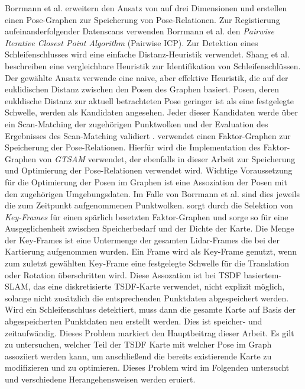Borrmann et al. \cite{borrmann2008globally} erweitern den Ansatz von \cite{lu1997globally} auf drei Dimensionen und erstellen einen Pose-Graphen zur Speicherung von Pose-Relationen. Zur Registierung aufeinanderfolgender Datenscans verwenden Borrmann et al. \cite{borrmann2008globally} den \textit{Pairwise Iterative Closest Point Algorithm} (Pairwise ICP). Zur Detektion eines Schleifenschlusses wird eine einfache Distanz-Heuristik verwendet. Shang et al. \cite{shan2020lio} beschreiben eine vergleichbare Heuristik zur Identifikation von Schleifenschlüssen. Der gewählte Ansatz verwende eine naive, aber effektive Heuristik, die auf der euklidischen Distanz zwischen den Posen des Graphen basiert. Posen, deren eukldische Distanz zur aktuell betrachteten Pose geringer ist als eine festgelegte Schwelle, werden als Kandidaten angesehen. Jeder dieser Kandidaten werde über ein Scan-Matching der zugehörigen Punktwolken und der Evaluation des Ergebnisses des Scan-Matching validiert \cite{shan2020lio}. \cite{shan2020lio} verwendet einen Faktor-Graphen zur Speicherung der Pose-Relationen. Hierfür wird die Implementation des Faktor-Graphen von \emph{GTSAM} \cite{dellaert2012factor} verwendet, der ebenfalls in dieser Arbeit zur Speicherung und Optimierung der Pose-Relationen verwendet wird.
Wichtige Voraussetzung für die Optimierung der Posen im Graphen ist eine Assoziation der Posen mit den zugehörigen Umgebungsdaten. Im Falle von Borrmann et al. \cite{borrmann2008globally} sind dies jeweils die zum Zeitpunkt aufgenommenen Punktwolken. \cite{shan2020lio} sorgt durch die Selektion von \emph{Key-Frames} für einen spärlich besetzten Faktor-Graphen und sorge so für eine Ausgeglichenheit zwischen Speicherbedarf und der Dichte der Karte. Die Menge der Key-Frames ist eine Untermenge der gesamten Lidar-Frames die bei der Kartierung aufgenommen wurden. Ein Frame wird als Key-Frame genutzt, wenn zum zuletzt gewählten Key-Frame eine festgelegte Schwelle für die Translation oder Rotation überschritten wird. Diese Assozation ist bei TSDF basiertem-SLAM, das eine diskretisierte TSDF-Karte verwendet, nicht explizit möglich, solange nicht zusätzlich die entsprechenden Punktdaten abgespeichert werden.
Wird ein Schleifenschluss detektiert, muss dann die gesamte Karte auf Basis der abgespeicherten Punktdaten neu erstellt werden. Dies ist speicher- und zeitaufwändig.
Dieses Problem markiert den Hauptbeitrag dieser Arbeit. Es gilt zu untersuchen, welcher Teil der TSDF Karte mit welcher Pose im Graph assoziiert werden kann, um anschließend die bereits existierende Karte zu modifizieren und zu optimieren.
Dieses Problem wird im Folgenden untersucht und verschiedene Herangehensweisen werden eruiert.


